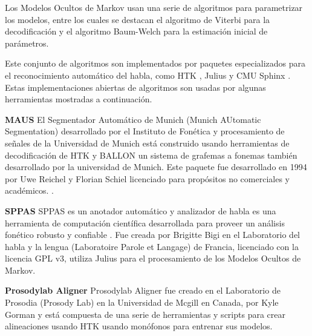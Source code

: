 Los Modelos Ocultos de Markov usan una serie de algoritmos para parametrizar los modelos, entre los cuales se destacan el algoritmo de Viterbi para la decodificación \cite{Forney1973TheAlgorithm} y el algoritmo Baum-Welch para la estimación inicial de parámetros.

Este conjunto de algoritmos son implementados por paquetes especializados para el reconocimiento automático del habla, como  HTK \cite{Young1994ThePhilosophy}, Julius \cite{LeeEurospeechEngine} y CMU Sphinx \cite{Lee1990AnSystem}. Estas implementaciones abiertas de algoritmos son usadas por algunas herramientas mostradas a continuación.

\textbf{MAUS}
El Segmentador Automático de Munich (Munich AUtomatic Segmentation) desarrollado por el Instituto de Fonética y procesamiento de señales de la Universidad de Munich está construido usando herramientas de decodificación de HTK y BALLON un sistema de grafemas a fonemas también desarrollado por la  universidad de Munich. Este paquete fue desarrollado en 1994 por Uwe Reichel y Florian Schiel licenciado para propósitos no comerciales y académicos. \cite{WesenickAPPLYINGPRONUNCIATION}. 

\textbf{SPPAS}
SPPAS es un anotador automático y analizador de habla es una herramienta de computación científica desarrollada para proveer un análisis fonético robusto y confiable \cite{Bigi2016ASPPAS}. Fue creada por Brigitte Bigi  en el Laboratorio del habla y la lengua (Laboratoire Parole et Langage) de Francia, licenciado con la licencia GPL v3, utiliza Julius para el procesamiento de los Modelos Ocultos de Markov.

\textbf{Prosodylab Aligner}
Prosodylab Aligner \cite{Gorman2011Prosodylab-aligner:Speech} fue creado en el Laboratorio de Prosodia (Prosody Lab) en la Universidad de Mcgill en Canada, por Kyle Gorman y está compuesta de una serie de herramientas y scripts para crear alineaciones usando HTK usando monófonos para entrenar sus modelos.

